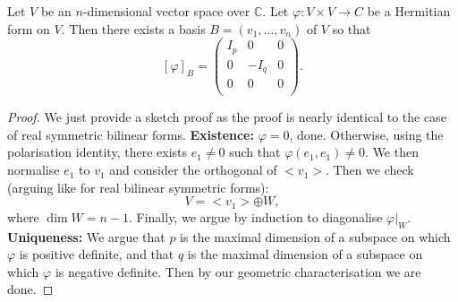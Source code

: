 \documentclass[a4paper]{scrartcl}
\begin{document}
\begin{theorem}
      Let $V$ be an $n$-dimensional vector space over $\mathbb{C}$. Let $\varphi:V \times V \rightarrow C$ be a Hermitian form on $V$. Then there exists a basis $B=\left(v_1, \ldots , v_n\right)$ of $V$ so that 
      \[[\varphi]_B=\left(
          \begin{array}{c|c|c}
           I_p &0&0\\
           \hline
           0 &-I_q&0\\
           \hline
           0 &0&0\\
           \end{array}
           \right).\]
\end{theorem}
\begin{proof}
      We just provide a sketch proof as the proof is nearly identical to the case of real symmetric bilinear forms.\newline 
      \textbf{Existence:}\newline 
       $\varphi=0$, done. Otherwise, using the polarisation identity, there exists $e_1 \neq 0$ such that $\varphi \left(e_1,e_1\right) \neq 0$. We then normalise $e_1$ to $v_1$ and consider the orthogonal of $<v_1>$. Then we check (arguing like for real bilinear symmetric forms): 
       \[V=<v_1> \oplus W ,\]
       where $\operatorname{dim}W=n-1$. Finally, we argue by induction to diagonalise $\varphi|_W$.\newline 
       \textbf{Uniqueness:}\newline 
       We argue that $p$ is the maximal dimension of a subspace on which $\varphi$ is positive definite, and that $q$ is the maximal dimension of a subspace on which $\varphi$ is negative definite. Then by our geometric characterisation we are done.
\end{proof}
\end{document}
